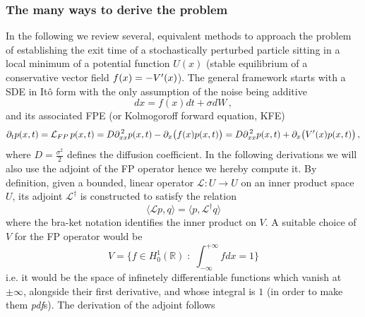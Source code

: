 \documentclass[../main.tex]{subfiles}
\begin{document}
\subsubsection{The many ways to derive the problem}\label{subsubsec4.1.1}
In the following we review several, equivalent methods to approach the problem of establishing the exit time of a stochastically perturbed particle sitting in a local minimum of a potential function $U(x)$ (stable equilibrium of a conservative vector field $f(x)=-V'(x)$).
The general framework starts with a SDE in Itô form with the only assumption of the noise being additive
\begin{equation}\label{eq2.4.1.1}
     dx = f(x)dt + \sigma dW\,,
\end{equation}
and its associated FPE (or Kolmogoroff forward equation, KFE)
\begin{equation}\label{eq2.4.1.2}
     \partial_t p(x,t) = \mathcal{L}_{FP}\,p(x,t) = D\partial_{xx}^{\,2}p(x,t) - \partial_{x}\big(f(x)p(x,t)\big) = D\partial_{xx}^{\,2}p(x,t) + \partial_{x}\big(V'(x)p(x,t)\big)\,,
\end{equation}
where $D=\frac{\sigma^{2}}{2}$ defines the diffusion coefficient.
In the following derivations we will also use the adjoint of the FP operator hence we hereby compute it. 
By definition, given a bounded, linear operator $\mathcal{L}:U\to U$ on an inner product space $U$, its adjoint $\mathcal{L}^{\dagger}$ is constructed to satisfy the relation
\begin{equation*}
     \langle \mathcal{L}p,q\rangle = \langle p,\mathcal{L}^{\dagger}q\rangle
\end{equation*}
where the bra-ket notation identifies the inner product on $V$.
A suitable choice of $V$ for the FP operator would be
\begin{equation*}
        V=\bigg\{f\in H^{1}_{0}(\mathbb{R})\;:\;\int_{-\infty}^{+\infty}fdx=1\bigg\}
\end{equation*}
i.e. it would be the space of infinetely differentiable functions which vanish at $\pm\infty$, alongside their first derivative, and whose integral is $1$ (in order to make them \textit{pdf}s).
The derivation of the adjoint follows
\end{document}
